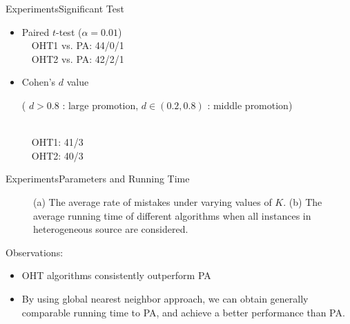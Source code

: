 \documentclass{beamer}
\begin{document}
\begin{frame}{Experiments}{Significant Test}
\begin{itemize}
\item
Paired $t$-test ($\alpha = 0.01$)
\\
~~OHT1 vs. PA: 44/0/1
\\
~~OHT2 vs. PA: 42/2/1
\item
Cohen's $d$ value 
\\
\begin{small}
( $d > 0.8$ : large promotion, $d \in (0.2, 0.8)$ : middle promotion)
\end{small}
\\
~~OHT1: 41/3 
\\
~~OHT2: 40/3
\end{itemize}
\end{frame}

\begin{frame}{Experiments}{Parameters and Running Time}
\begin{small}
\begin{figure}
\centering
  \caption{(a) The average rate of mistakes under varying values of $K$. (b) The average running time of different algorithms when all instances in heterogeneous source are considered.}
  \label{average eok}
\end{figure}
Observations:
\begin{itemize}
\item
OHT algorithms consistently outperform PA
\item
By using global nearest neighbor approach, we can obtain generally comparable running time to PA, and achieve a better performance than PA.
\end{itemize}
\end{small}
\end{frame}
\end{document}

